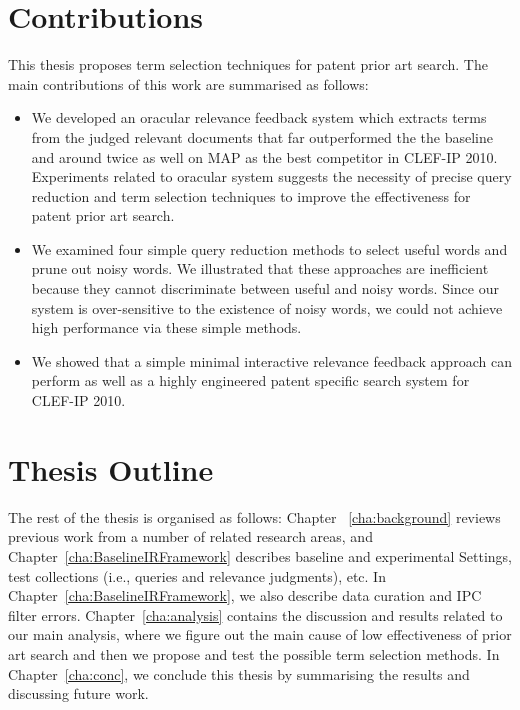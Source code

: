 \section{Contributions}
\label{sec:Contributions}
This thesis proposes term selection techniques for patent prior art search.
The main contributions of this work are summarised as follows:
\begin{itemize}
\item We developed an oracular relevance feedback system which extracts terms from the judged relevant documents that far outperformed the the baseline and around twice as well on MAP as the best competitor in CLEF-IP 2010. Experiments related to oracular system suggests the necessity of precise query reduction and term selection techniques to improve the effectiveness for patent prior art search.
\item We examined four simple query reduction methods to select useful words and prune out noisy words. We illustrated that these approaches are inefficient because they cannot discriminate between useful and noisy words. Since our system is over-sensitive to the existence of noisy words, we could not achieve high performance via these simple methods.
\item We showed that a simple minimal interactive relevance feedback approach can perform as well as a highly engineered patent specific search system for CLEF-IP 2010.
\end{itemize}
\section{Thesis Outline}
\label{sec:outline}
The rest of the thesis is organised as follows: Chapter ~\ref{cha:background} reviews previous work from a number
of related research areas, and Chapter~\ref{cha:BaselineIRFramework} describes baseline and experimental Settings, 
test collections (i.e., queries and relevance judgments),
etc. In Chapter~\ref{cha:BaselineIRFramework}, we also describe data curation and IPC filter errors.
Chapter~\ref{cha:analysis} contains the discussion and results related to our main analysis, where we figure out 
the main cause of low effectiveness of prior art search and then we propose and test the possible term selection methods. 
In Chapter~\ref{cha:conc}, we conclude this thesis by 
summarising the results and discussing future work.


